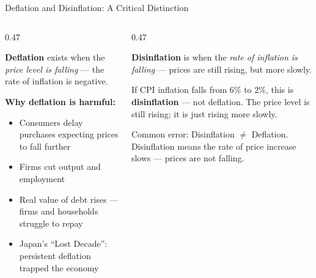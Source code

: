 \documentclass[16pt,aspectratio=169]{beamer}
\begin{document}
\begin{frame}{Deflation and Disinflation: A Critical Distinction}
    \begin{columns}
        \begin{column}{0.47\textwidth}
            \begin{definition}
                \textbf{Deflation} exists when the \textit{price level is falling} --- the rate of inflation is negative.
            \end{definition}
            \vspace{0.4em}
            \textbf{Why deflation is harmful:}
            \begin{itemize}
                \item Consumers delay purchases expecting prices to fall further
                \item Firms cut output and employment
                \item Real value of debt rises --- firms and households struggle to repay
                \item Japan's ``Lost Decade'': persistent deflation trapped the economy
            \end{itemize}
        \end{column}
        \begin{column}{0.47\textwidth}
            \begin{definition}
                \textbf{Disinflation} is when the \textit{rate of inflation is falling} --- prices are still rising, but more slowly.
            \end{definition}
            \vspace{0.4em}
            \begin{example}
                If CPI inflation falls from 6\% to 2\%, this is \textbf{disinflation} --- not deflation. The price level is still rising; it is just rising more slowly.
            \end{example}
            \vspace{0.3em}
            \alert{Common error:} Disinflation $\neq$ Deflation. Disinflation means the rate of price increase slows --- prices are not falling.
        \end{column}
    \end{columns}
\end{frame}
\end{document}
